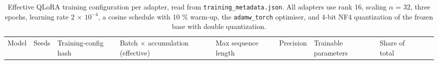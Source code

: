 \begin{landscape}
\begingroup\scriptsize\setlength{\tabcolsep}{1pt}\sloppy
\begin{longtable}[]{@{}
  >{\raggedright\arraybackslash}p{}
  >{\raggedright\arraybackslash}p{}
  >{\raggedright\arraybackslash}p{}
  >{\raggedright\arraybackslash}p{}
  >{\raggedleft\arraybackslash}p{}
  >{\raggedright\arraybackslash}p{}
  >{\raggedleft\arraybackslash}p{}
  >{\raggedleft\arraybackslash}p{}
  >{\raggedright\arraybackslash}p{}
  >{\raggedleft\arraybackslash}p{}@{}}
\caption{Effective QLoRA training configuration per adapter, read from \protect\texttt{training\_metadata.json}. All adapters use rank 16, scaling \(\alpha\) = 32, three epochs, learning rate 2 \(\times\) \(10^{-4}\), a cosine schedule with 10 \% warm-up, the \protect\texttt{adamw\_torch} optimiser, and 4-bit NF4 quantization of the frozen base with double quantization.}\tabularnewline
\toprule\noalign{}
\begin{minipage}[b]{\linewidth}\raggedright
Model
\end{minipage} & \begin{minipage}[b]{\linewidth}\raggedright
Seeds
\end{minipage} & \begin{minipage}[b]{\linewidth}\raggedright
Training-config hash
\end{minipage} & \begin{minipage}[b]{\linewidth}\raggedright
Batch \(\times\) accumulation (effective)
\end{minipage} & \begin{minipage}[b]{\linewidth}\raggedleft
Max sequence length
\end{minipage} & \begin{minipage}[b]{\linewidth}\raggedright
Precision
\end{minipage} & \begin{minipage}[b]{\linewidth}\raggedleft
Trainable parameters
\end{minipage} & \begin{minipage}[b]{\linewidth}\raggedleft
Share of total
\end{minipage} & \begin{minipage}[b]{\linewidth}\raggedright

\end{minipage}
\end{longtable}
\end{landscape}
